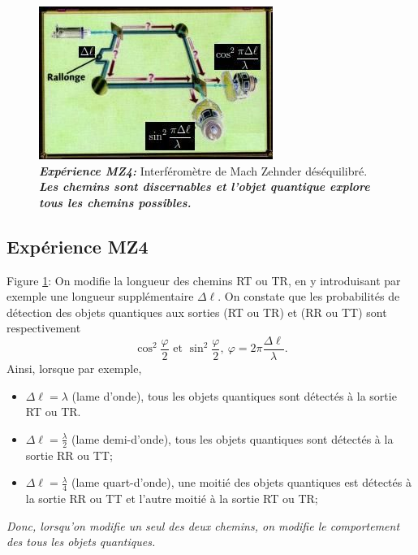 \begin{figure}[ptbh]
\begin{minipage}[c]{.48\linewidth}
\else
	\includegraphics[scale=1]{graphics/MZ4.jpg}%
\fi
\caption{\emph{\textbf{Expérience MZ4:}} Interféromètre de Mach Zehnder
déséquilibré.
\emph{\textbf{Les chemins sont discernables et l'objet quantique explore tous
les chemins
possibles.}}}%
\label{fig:MZ4}%
\end{minipage}
\end{figure}

\subsection{Expérience MZ4}

Figure \ref{fig:MZ4}: On modifie la longueur des chemins RT ou TR, en y
introduisant par exemple une longueur supplémentaire $\Delta\ell$. On constate
que les probabilités de détection des objets quantiques aux sorties (RT ou TR)
et (RR ou TT) sont respectivement%
\begin{equation}
\cos^{2}\frac{\varphi}{2}\text{ et }\sin^{2}\frac{\varphi}{2},\ \varphi
=2\pi\frac{\Delta\ell}{\lambda}.
\end{equation}
Ainsi, lorsque par exemple,

\begin{itemize}
\item $\Delta\ell=\lambda$ (lame d'onde), tous les objets quantiques sont
détectés à la
sortie RT ou TR.

\item $\Delta\ell=\frac{\lambda}{2}$ (lame demi-d'onde), tous les objets
quantiques sont détectés
à la sortie RR ou TT;

\item $\Delta\ell=\frac{\lambda}{4}$ (lame quart-d'onde), une moitié des objets
quantiques est détectés à la
sortie RR ou TT et l'autre moitié à la sortie RT ou TR;

\end{itemize}

\medskip
\colorbox[gray]{0.8}{
\parbox[c]{0.9\textwidth}{
\emph{Donc, lorsqu'on modifie un seul des deux chemins, on modifie le
comportement des tous les objets quantiques.}
}}
\medskip

